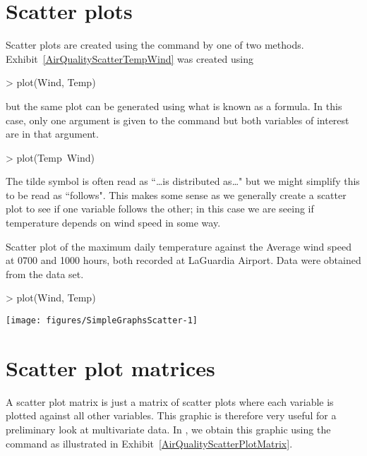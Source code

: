 \section{Scatter plots}

Scatter plots are created using the  command by one of two methods. Exhibit~\ref{AirQualityScatterTempWind} was created using
\begin{Schunk}
\begin{Sinput}
> plot(Wind, Temp)
\end{Sinput}
\end{Schunk}
but the same plot can be generated using what is known as a formula. In this case, only one argument is given to the  command but both variables of interest are in that argument.
\begin{Schunk}
\begin{Sinput}
> plot(Temp~Wind)
\end{Sinput}
\end{Schunk}
The tilde symbol is often read as ``\ldots is distributed as\ldots" but we might simplify this to be read as ``follows". This makes some sense as we generally create a scatter plot to see if one variable follows the other; in this case we are seeing if temperature depends on wind speed in some way.

\begin{exhibit}
\begin{center}
\caption{Scatter plot of the maximum daily temperature against the Average wind speed at 0700 and 1000 hours, both recorded at LaGuardia Airport. Data were obtained from the  data set.}
\label{AirQualityScatterTempWind}
\begin{Schunk}
\begin{Sinput}
> plot(Wind, Temp)
\end{Sinput}

\texttt{[image: figures/SimpleGraphsScatter-1]} \end{Schunk}
\end{center}
\end{exhibit}

\section{Scatter plot matrices}
\label{ScatterPlotMatrices}

A scatter plot matrix is just a matrix of scatter plots where each variable is plotted against all other variables. This graphic is therefore very useful for a preliminary look at multivariate data. In \R{}, we obtain this graphic using the  command as illustrated in Exhibit~\ref{AirQualityScatterPlotMatrix}.

